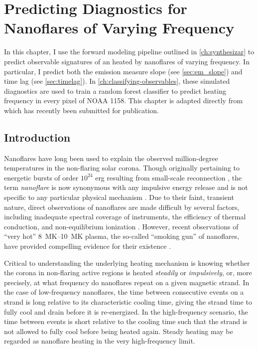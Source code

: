 \chapter{Predicting Diagnostics for Nanoflares of Varying Frequency}\label{ch:modeling-observables}
\thispagestyle{firstpageofchapterstyle}

In this chapter, I use the forward modeling pipeline outlined in \autoref{ch:synthesizar} to predict observable signatures of an \AR{} heated by nanoflares of varying frequency. In particular, I predict both the emission measure slope (see \autoref{sec:em_slope}) and time lag (see \autoref{sec:timelag}). In \autoref{ch:classifying-observables}, these simulated diagnostics are used to train a random forest classifier to predict heating frequency in every pixel of \AR{} NOAA 1158. This chapter is adapted directly from \citet{barnes_understanding_2019} which has recently been submitted for publication. 

\section{Introduction}\label{sec:modeling-observables:introduction}

Nanoflares have long been used to explain the observed million-degree temperatures in the non-flaring solar corona. Though originally pertaining to energetic bursts of order $10^{24}$ erg resulting from small-scale reconnection \citep{parker_nanoflares_1988}, the term \textit{nanoflare} is now synonymous with any impulsive energy release and is not specific to any particular physical mechanism \citep{klimchuk_key_2015}. Due to their faint, transient nature, direct observations of nanoflares are made difficult by several factors, including inadequate spectral coverage of instruments, the efficiency of thermal conduction, and non-equilibrium ionization \citep{cargill_implications_1994,winebarger_defining_2012,barnes_inference_2016}. However, recent observations of ``very hot'' \SIrange{8}{10}{\mega\kelvin} plasma, the so-called ``smoking gun'' of nanoflares, have provided compelling evidence for their existence \citep[e.g.][]{brosius_pervasive_2014,caspi_new_2015,parenti_spectroscopy_2017,ishikawa_detection_2017}.

Critical to understanding the underlying heating mechanism is knowing whether the corona in non-flaring active regions is heated \textit{steadily} or \textit{impulsively}, or, more precisely, at what frequency do nanoflares repeat on a given magnetic strand. In the case of low-frequency nanoflares, the time between consecutive events on a strand is long relative to its characteristic cooling time, giving the strand time to fully cool and drain before it is re-energized. In the high-frequency scenario, the time between events is short relative to the cooling time such that the strand is not allowed to fully cool before being heated again. Steady heating may be regarded as nanoflare heating in the very high-frequency limit.


